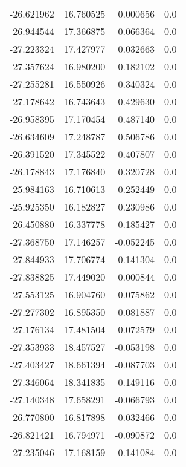 \begin{tabular}{rrrr}
      -26.621962 &        16.760525 &    0.000656 &   0.0 \\
      -26.944544 &        17.366875 &   -0.066364 &   0.0 \\
      -27.223324 &        17.427977 &    0.032663 &   0.0 \\
      -27.357624 &        16.980200 &    0.182102 &   0.0 \\
      -27.255281 &        16.550926 &    0.340324 &   0.0 \\
      -27.178642 &        16.743643 &    0.429630 &   0.0 \\
      -26.958395 &        17.170454 &    0.487140 &   0.0 \\
      -26.634609 &        17.248787 &    0.506786 &   0.0 \\
      -26.391520 &        17.345522 &    0.407807 &   0.0 \\
      -26.178843 &        17.176840 &    0.320728 &   0.0 \\
      -25.984163 &        16.710613 &    0.252449 &   0.0 \\
      -25.925350 &        16.182827 &    0.230986 &   0.0 \\
      -26.450880 &        16.337778 &    0.185427 &   0.0 \\
      -27.368750 &        17.146257 &   -0.052245 &   0.0 \\
      -27.844933 &        17.706774 &   -0.141304 &   0.0 \\
      -27.838825 &        17.449020 &    0.000844 &   0.0 \\
      -27.553125 &        16.904760 &    0.075862 &   0.0 \\
      -27.277302 &        16.895350 &    0.081887 &   0.0 \\
      -27.176134 &        17.481504 &    0.072579 &   0.0 \\
      -27.353933 &        18.457527 &   -0.053198 &   0.0 \\
      -27.403427 &        18.661394 &   -0.087703 &   0.0 \\
      -27.346064 &        18.341835 &   -0.149116 &   0.0 \\
      -27.140348 &        17.658291 &   -0.066793 &   0.0 \\
      -26.770800 &        16.817898 &    0.032466 &   0.0 \\
      -26.821421 &        16.794971 &   -0.090872 &   0.0 \\
      -27.235046 &        17.168159 &   -0.141084 &   0.0 \\

\end{tabular}
